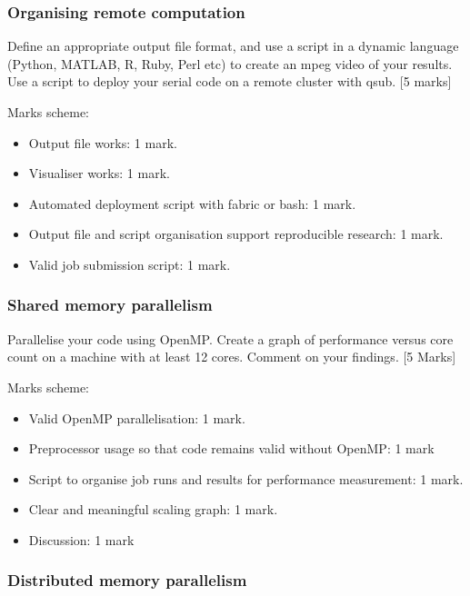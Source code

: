 \subsubsection{Organising remote
computation}\label{organising-remote-computation}

Define an appropriate output file format, and use a script in a dynamic
language (Python, MATLAB, R, Ruby, Perl etc) to create an mpeg video of
your results. Use a script to deploy your serial code on a remote
cluster with qsub. {[}5 marks{]}

Marks scheme:

\begin{itemize}
\itemsep1pt\parskip0pt
\item
  Output file works: 1 mark.
\item
  Visualiser works: 1 mark.
\item
  Automated deployment script with fabric or bash: 1 mark.
\item
  Output file and script organisation support reproducible research: 1
  mark.
\item
  Valid job submission script: 1 mark.
\end{itemize}

\subsubsection{Shared memory
parallelism}\label{shared-memory-parallelism-2}

Parallelise your code using OpenMP. Create a graph of performance versus
core count on a machine with at least 12 cores. Comment on your
findings. {[}5 Marks{]}

Marks scheme:

\begin{itemize}
\itemsep1pt\parskip0pt
\item
  Valid OpenMP parallelisation: 1 mark.
\item
  Preprocessor usage so that code remains valid without OpenMP: 1 mark
\item
  Script to organise job runs and results for performance measurement: 1
  mark.
\item
  Clear and meaningful scaling graph: 1 mark.
\item
  Discussion: 1 mark
\end{itemize}

\subsubsection{Distributed memory
parallelism}\label{distributed-memory-parallelism-2}

